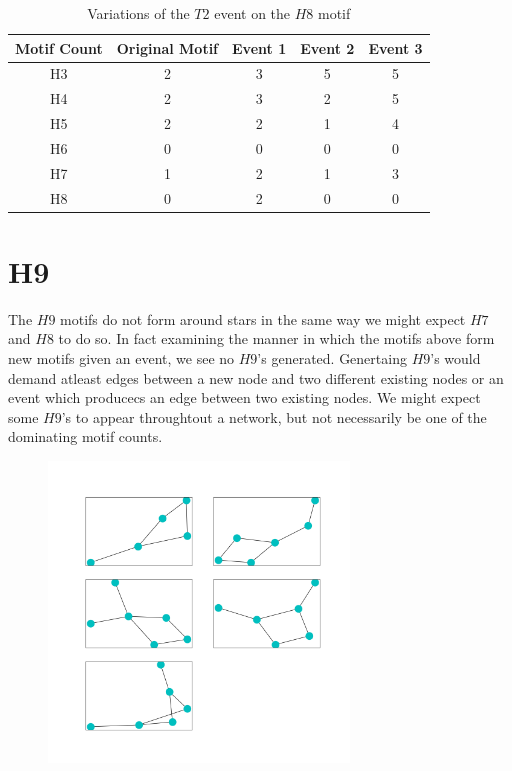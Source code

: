 \FloatBarrier
\begin{table}
    \centering
    \begin{tabular}{||c c c c c||} 
    \hline
    Motif Count & Original Motif & Event 1 & Event 2 & Event 3 \\ [0.5ex] 
    \hline\hline
    H3 & 2 & 3 & 5 & 5\\ 
    \hline
    H4 & 2 & 3 & 2 & 5 \\
    \hline
    H5 & 2 & 2 & 1 & 4 \\
    \hline
    H6 & 0 & 0 & 0 & 0 \\
    \hline
    H7 & 1 & 2 & 1 & 3 \\
    \hline
    H8 & 0 & 2 & 0 & 0\\
    \hline
   \end{tabular}
   \caption{Variations of the $T2$ event on the $H8$ motif}
   \label{table:6}
\end{table}

\section{H9}
The $H9$ motifs do not form around stars in the same way we might expect $H7$ and $H8$ to 
do so. In fact examining the manner in which the motifs above form new motifs given an event,
we see no $H9$'s generated. Genertaing $H9$'s would demand atleast edges between a new node and two 
different existing nodes or an event which producecs an edge between two existing nodes. We might expect
some $H9$'s to appear throughtout a network, but not necessarily be one of the dominating motif counts.

\begin{figure}[!ht]
    \includegraphics[width=8cm]{Images/H9_evolution.png}
    \centering
\end{figure}

